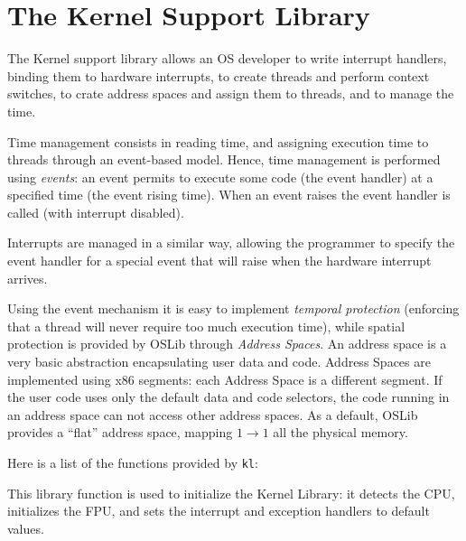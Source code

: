 \documentclass[a4paper]{report}
\begin{document}
\section{The Kernel Support Library}
The Kernel support library allows an OS developer to write interrupt
handlers, binding them to hardware interrupts, to create threads and
perform context switches, to crate address spaces and assign them to
threads, and to manage the time.

Time management consists in reading time, and assigning execution
time to threads through an event-based model. Hence, time management
is performed using {\em events}: an event permits to execute some code
(the event handler) at a specified time (the event rising time).
When an event raises the event handler is called (with interrupt disabled).

Interrupts are managed in a similar way, allowing the programmer to
specify the event handler for a special event that will raise when the
hardware interrupt arrives.

Using the event mechanism it is easy to implement {\em temporal protection}
(enforcing that a thread will never require too much execution time), while
spatial protection is provided by OSLib through {\em Address Spaces}. An
address space is a very basic abstraction encapsulating user data and code.
Address Spaces are implemented using x86 segments: each Address Space is a
different segment. If the user code uses only the default data and code
selectors, the code running in an address space can not access other address
spaces. As a default, OSLib provides a ``flat'' address space, mapping
$1 \rightarrow 1$ all the physical memory.

Here is a list of the functions provided by {\tt kl}:


This library function is used to initialize the Kernel Library: it
detects the CPU, initializes the FPU, and sets the interrupt and
exception handlers to default values.
\end{document}
